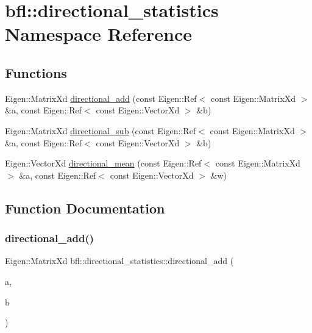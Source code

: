 \hypertarget{namespacebfl_1_1directional__statistics}{}\section{bfl\+:\+:directional\+\_\+statistics Namespace Reference}
\label{namespacebfl_1_1directional__statistics}
\subsection*{Functions}
\begin{DoxyCompactItemize}
\item 
Eigen\+::\+Matrix\+Xd \mbox{\hyperlink{namespacebfl_1_1directional__statistics_af9984a4df2b3f6f0bc0c264783181123}{directional\+\_\+add}} (const Eigen\+::\+Ref$<$ const Eigen\+::\+Matrix\+Xd $>$ \&a, const Eigen\+::\+Ref$<$ const Eigen\+::\+Vector\+Xd $>$ \&b)
\item 
Eigen\+::\+Matrix\+Xd \mbox{\hyperlink{namespacebfl_1_1directional__statistics_a18bffca88c7ea5f4ea11d2ad910736fe}{directional\+\_\+sub}} (const Eigen\+::\+Ref$<$ const Eigen\+::\+Matrix\+Xd $>$ \&a, const Eigen\+::\+Ref$<$ const Eigen\+::\+Vector\+Xd $>$ \&b)
\item 
Eigen\+::\+Vector\+Xd \mbox{\hyperlink{namespacebfl_1_1directional__statistics_ad8758aac208bc2baa75aad514a3f53e6}{directional\+\_\+mean}} (const Eigen\+::\+Ref$<$ const Eigen\+::\+Matrix\+Xd $>$ \&a, const Eigen\+::\+Ref$<$ const Eigen\+::\+Vector\+Xd $>$ \&w)
\end{DoxyCompactItemize}


\subsection{Function Documentation}
\mbox{\label{namespacebfl_1_1directional__statistics_af9984a4df2b3f6f0bc0c264783181123}} 
\subsubsection{\texorpdfstring{directional\+\_\+add()}{directional\_add()}}
{\footnotesize\ttfamily Eigen\+::\+Matrix\+Xd bfl\+::directional\+\_\+statistics\+::directional\+\_\+add (\begin{DoxyParamCaption}\item[{const Eigen\+::\+Ref$<$ const Eigen\+::\+Matrix\+Xd $>$ \&}]{a,  }\item[{const Eigen\+::\+Ref$<$ const Eigen\+::\+Vector\+Xd $>$ \&}]{b }\end{DoxyParamCaption})}



